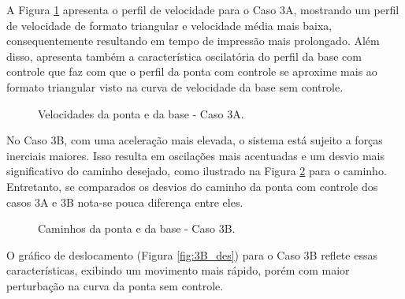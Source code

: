 A Figura \ref{fig:3A_vel} apresenta o perfil de velocidade para o Caso 3A, mostrando um perfil de velocidade de formato triangular e velocidade média mais baixa, consequentemente resultando em tempo de impressão mais prolongado. Além disso, apresenta também a característica oscilatória do perfil da base com controle que faz com que o perfil da ponta com controle se aproxime mais ao formato triangular visto na curva de velocidade da base sem controle.

\begin{figure}[H]
    \centering
    \hfill
    \caption{Velocidades da ponta e da base - Caso 3A.}
    \label{fig:3A_vel}
\end{figure}

No Caso 3B, com uma aceleração mais elevada, o sistema está sujeito a forças inerciais maiores. Isso resulta em oscilações mais acentuadas e um desvio mais significativo do caminho desejado, como ilustrado na Figura \ref{fig:3B_cam} para o caminho. Entretanto, se comparados os desvios do caminho da ponta com controle dos casos 3A e 3B nota-se pouca diferença entre eles.

\begin{figure}[H]
    \centering
    \hfill
    \hfill
    \hfill
    \caption{Caminhos da ponta e da base - Caso 3B.}
    \label{fig:3B_cam}
\end{figure}

O gráfico de deslocamento (Figura \ref{fig:3B_des}) para o Caso 3B reflete essas características, exibindo um movimento mais rápido, porém com maior perturbação na curva da ponta sem controle.

